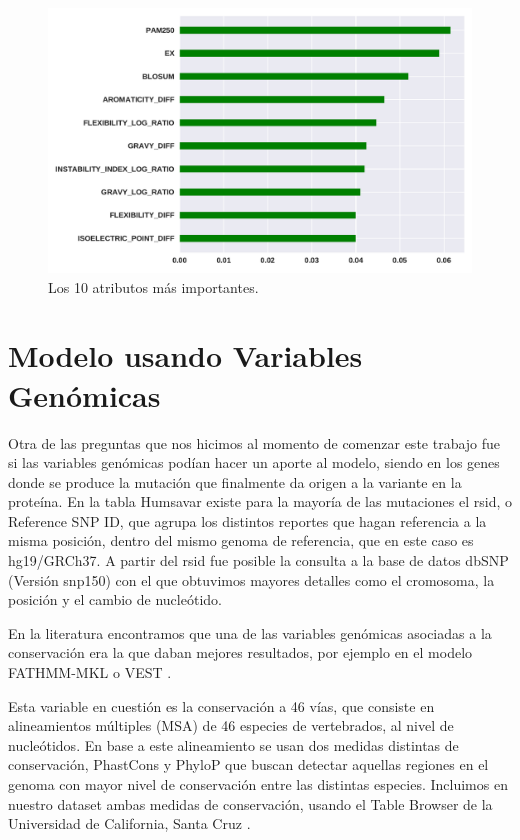 \begin{figure}[H]
    \centering
    \includegraphics[scale=0.73]{documents/latex/figures/3/importance_1.pdf}
    \caption{Los 10 atributos más importantes.}
    \label{fig:importance_1}
\end{figure}


\section{Modelo usando Variables Genómicas}

Otra de las preguntas que nos hicimos al momento de comenzar este trabajo fue si las variables genómicas podían hacer un aporte al modelo, siendo en los genes donde se produce la mutación que finalmente da origen a la variante en la proteína. En la tabla Humsavar existe para la mayoría de las mutaciones el rsid, o Reference SNP ID, que agrupa los distintos reportes que hagan referencia a la misma posición, dentro del mismo genoma de referencia, que en este caso es hg19/GRCh37. A partir del rsid fue posible la consulta a la base de datos dbSNP (Versión snp150) con el que obtuvimos mayores detalles como el cromosoma, la posición y el cambio de nucleótido. 

En la literatura encontramos que una de las variables genómicas asociadas a la conservación era la que daban mejores resultados, por ejemplo en el modelo FATHMM-MKL \cite{Shihab2015} o VEST \cite{Carter2013}.

Esta variable en cuestión es la conservación a 46 vías, que consiste en alineamientos múltiples (MSA) de 46 especies de vertebrados, al nivel de nucleótidos. En base a este alineamiento se usan dos medidas distintas de conservación, PhastCons \cite{siepel2005evolutionarily} y PhyloP \cite{Pollard2010} que buscan detectar aquellas regiones en el genoma con mayor nivel de conservación entre las distintas especies. Incluimos en nuestro dataset ambas medidas de conservación, usando el Table Browser de la Universidad de California, Santa Cruz \cite{Karolchik2004}.

